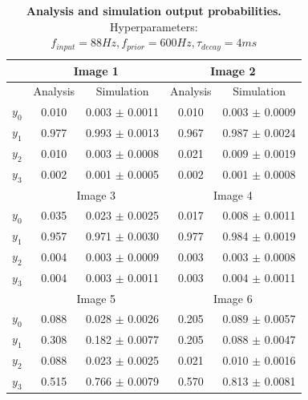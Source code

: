 \begin{table}[]
\centering
\label{tab:1D_88_600_4}
\small
\tabcolsep=0.11cm
\begin{tabular}{|c|cc|cc|}
\hline
                       & \multicolumn{2}{c|}{Image 1}                       & \multicolumn{2}{c|}{Image 2}                       \\ \hline
                       & \multicolumn{1}{c|}{Analysis} & Simulation         & \multicolumn{1}{c|}{Analysis} & Simulation         \\ \hline
$y_0$                  & \multicolumn{1}{c|}{0.010}    & 0.003 $\pm$ 0.0011 & \multicolumn{1}{c|}{0.010}    & 0.003 $\pm$ 0.0009 \\ \hline
$y_1$                  & \multicolumn{1}{c|}{0.977}    & 0.993 $\pm$ 0.0013 & \multicolumn{1}{c|}{0.967}    & 0.987 $\pm$ 0.0024 \\ \hline
$y_2$                  & \multicolumn{1}{c|}{0.010}    & 0.003 $\pm$ 0.0008 & \multicolumn{1}{c|}{0.021}    & 0.009 $\pm$ 0.0019 \\ \hline
$y_3$                  & \multicolumn{1}{c|}{0.002}    & 0.001 $\pm$ 0.0005 & \multicolumn{1}{c|}{0.002}    & 0.001 $\pm$ 0.0008 \\ \hline
                       & \multicolumn{2}{c|}{Image 3}                       & \multicolumn{2}{c|}{Image 4}                       \\ \hline
$y_0$                  & \multicolumn{1}{c|}{0.035}    & 0.023 $\pm$ 0.0025 & \multicolumn{1}{c|}{0.017}    & 0.008 $\pm$ 0.0011 \\ \hline
$y_1$                  & \multicolumn{1}{c|}{0.957}    & 0.971 $\pm$ 0.0030 & \multicolumn{1}{c|}{0.977}    & 0.984 $\pm$ 0.0019 \\ \hline
$y_2$                  & \multicolumn{1}{c|}{0.004}    & 0.003 $\pm$ 0.0009 & \multicolumn{1}{c|}{0.003}    & 0.003 $\pm$ 0.0008 \\ \hline
$y_3$                  & \multicolumn{1}{c|}{0.004}    & 0.003 $\pm$ 0.0011 & \multicolumn{1}{c|}{0.003}    & 0.004 $\pm$ 0.0011 \\ \hline
						& \multicolumn{2}{c|}{Image 5}                       & \multicolumn{2}{c|}{Image 6}                       \\ \hline
$y_0$                  & \multicolumn{1}{c|}{0.088}    & 0.028 $\pm$ 0.0026 & \multicolumn{1}{c|}{0.205}    & 0.089 $\pm$ 0.0057 \\ \hline
$y_1$                  & \multicolumn{1}{c|}{0.308}    & 0.182 $\pm$ 0.0077 & \multicolumn{1}{c|}{0.205}    & 0.088 $\pm$ 0.0047 \\ \hline
$y_2$                  & \multicolumn{1}{c|}{0.088}    & 0.023 $\pm$ 0.0025 & \multicolumn{1}{c|}{0.021}    & 0.010 $\pm$ 0.0016 \\ \hline
$y_3$                  & \multicolumn{1}{c|}{0.515}    & 0.766 $\pm$ 0.0079 & \multicolumn{1}{c|}{0.570}    & 0.813 $\pm$ 0.0081 \\ \hline
\end{tabular}
\caption{\textbf{Analysis and simulation output probabilities. } Hyperparameters: $f_{input} = 88 Hz, f_{prior} = 600 Hz, \tau_{decay} = 4 ms$}
\end{table}

